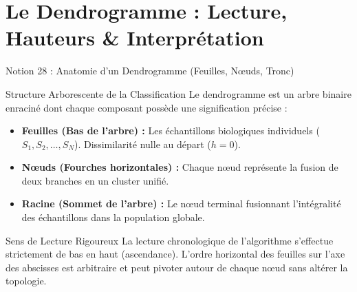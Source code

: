 \documentclass[aspectratio=169,10pt]{beamer}
\begin{document}
\section{Le Dendrogramme : Lecture, Hauteurs \& Interprétation}

\begin{frame}{Notion 28 : Anatomie d'un Dendrogramme (Feuilles, Nœuds, Tronc)}
  \begin{conceptbox}{Structure Arborescente de la Classification}
    \footnotesize
    Le dendrogramme est un arbre binaire enraciné dont chaque composant possède une signification précise :
    \begin{itemize}
      \item \textbf{Feuilles (Bas de l'arbre) :} Les échantillons biologiques individuels ($S_1, S_2, \dots, S_N$). Dissimilarité nulle au départ ($h = 0$).
      \item \textbf{Nœuds (Fourches horizontales) :} Chaque nœud représente la fusion de deux branches en un cluster unifié.
      \item \textbf{Racine (Sommet de l'arbre) :} Le nœud terminal fusionnant l'intégralité des échantillons dans la population globale.
    \end{itemize}
  \end{conceptbox}
  \vspace{1mm}
  \begin{takeawaybox}{Sens de Lecture Rigoureux}
    \footnotesize
    La lecture chronologique de l'algorithme s'effectue strictement de bas en haut (ascendance). L'ordre horizontal des feuilles sur l'axe des abscisses est arbitraire et peut pivoter autour de chaque nœud sans altérer la topologie.
  \end{takeawaybox}
\end{frame}
\end{document}
